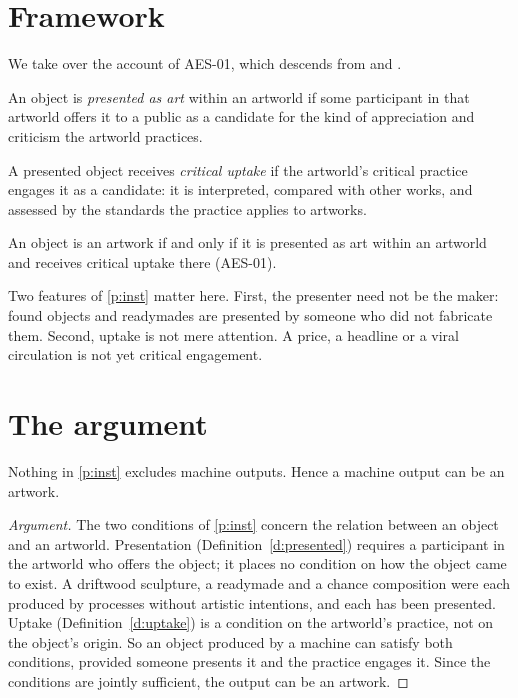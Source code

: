 \documentclass{situationist-preprint}
\begin{document}
\section{Framework}

We take over the account of AES-01, which descends from \citet{Danto1964} and \citet{Dickie1974}.

\begin{definition}\label{d:presented}
An object is \emph{presented as art} within an artworld if some participant in that artworld offers it to a public as a candidate for the kind of appreciation and criticism the artworld practices.
\end{definition}

\begin{definition}\label{d:uptake}
A presented object receives \emph{critical uptake} if the artworld's critical practice engages it as a candidate: it is interpreted, compared with other works, and assessed by the standards the practice applies to artworks.
\end{definition}

\begin{principle}\label{p:inst}
An object is an artwork if and only if it is presented as art within an artworld and receives critical uptake there (AES-01).
\end{principle}

Two features of \ref{p:inst} matter here. First, the presenter need not be the maker: found objects and readymades are presented by someone who did not fabricate them. Second, uptake is not mere attention. A price, a headline or a viral circulation is not yet critical engagement.

\section{The argument}

\begin{proposition}\label{prop:possible}
Nothing in \ref{p:inst} excludes machine outputs. Hence a machine output can be an artwork.
\end{proposition}

\begin{proof}[Argument]
The two conditions of \ref{p:inst} concern the relation between an object and an artworld. Presentation (Definition~\ref{d:presented}) requires a participant in the artworld who offers the object; it places no condition on how the object came to exist. A driftwood sculpture, a readymade and a chance composition were each produced by processes without artistic intentions, and each has been presented. Uptake (Definition~\ref{d:uptake}) is a condition on the artworld's practice, not on the object's origin. So an object produced by a machine can satisfy both conditions, provided someone presents it and the practice engages it. Since the conditions are jointly sufficient, the output can be an artwork.
\end{proof}
\end{document}
